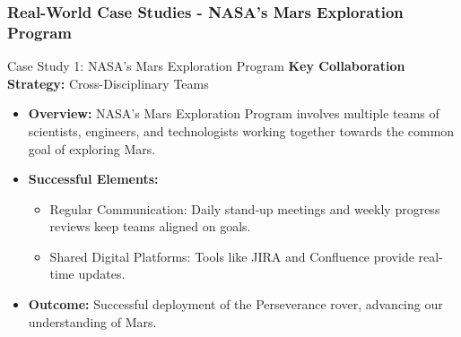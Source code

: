 \documentclass[aspectratio=169]{beamer}
\begin{document}
\begin{frame}[fragile]
    \frametitle{Real-World Case Studies - NASA's Mars Exploration Program}
    \begin{block}{Case Study 1: NASA's Mars Exploration Program}
        \textbf{Key Collaboration Strategy:} Cross-Disciplinary Teams

        \begin{itemize}
            \item \textbf{Overview:}
                NASA's Mars Exploration Program involves multiple teams of scientists, engineers, and technologists working together towards the common goal of exploring Mars.
            \item \textbf{Successful Elements:}
                \begin{itemize}
                    \item Regular Communication: Daily stand-up meetings and weekly progress reviews keep teams aligned on goals.
                    \item Shared Digital Platforms: Tools like JIRA and Confluence provide real-time updates.
                \end{itemize}
            \item \textbf{Outcome:}
                Successful deployment of the Perseverance rover, advancing our understanding of Mars.
        \end{itemize}
    \end{block}
\end{frame}
\end{document}
